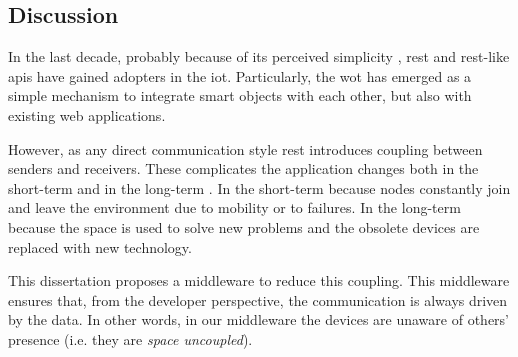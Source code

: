 \subsection{Discussion}


In the last decade, probably because of its perceived simplicity \citep{guinard_search_2011}, \ac{rest} and \ac{rest}-like \acp{api} have gained adopters in the \ac{iot}.
Particularly, the \ac{wot} has emerged as a simple mechanism to integrate smart objects with each other, but also with existing web applications.

However, as any direct communication style \ac{rest} introduces coupling between senders and receivers.
These complicates the application changes both in the short-term and in the long-term \citep{johanson_extending_2004}.
In the short-term because nodes constantly join and leave the environment due to mobility or to failures.
In the long-term because the space is used to solve new problems and the obsolete devices are replaced with new technology.

This dissertation proposes a middleware to reduce this coupling.
This middleware ensures that, from the developer perspective, the communication is always driven by the data.
In other words, in our middleware the devices are unaware of others' presence (i.e. they are \emph{space uncoupled}).